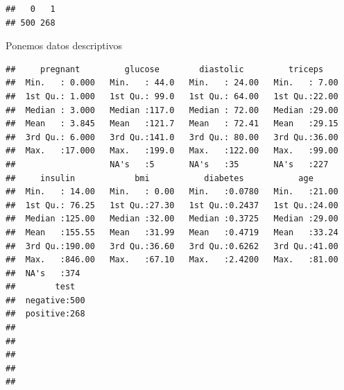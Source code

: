 \documentclass[
]{article}
\newenvironment{Shaded}{\begin{snugshade}}{\end{snugshade}}
\newcommand{\FunctionTok}[1]{\textcolor[rgb]{0.00,0.00,0.00}{#1}}
\newcommand{\NormalTok}[1]{#1}
\newcommand{\OtherTok}[1]{\textcolor[rgb]{0.56,0.35,0.01}{#1}}
\newcommand{\SpecialCharTok}[1]{\textcolor[rgb]{0.00,0.00,0.00}{#1}}
\newcommand{\StringTok}[1]{\textcolor[rgb]{0.31,0.60,0.02}{#1}}
\begin{document}
\begin{Shaded}
\end{Shaded}

\begin{verbatim}
##   0   1 
## 500 268
\end{verbatim}

Ponemos datos descriptivos

\begin{Shaded}
\end{Shaded}

\begin{verbatim}
##     pregnant         glucose        diastolic         triceps     
##  Min.   : 0.000   Min.   : 44.0   Min.   : 24.00   Min.   : 7.00  
##  1st Qu.: 1.000   1st Qu.: 99.0   1st Qu.: 64.00   1st Qu.:22.00  
##  Median : 3.000   Median :117.0   Median : 72.00   Median :29.00  
##  Mean   : 3.845   Mean   :121.7   Mean   : 72.41   Mean   :29.15  
##  3rd Qu.: 6.000   3rd Qu.:141.0   3rd Qu.: 80.00   3rd Qu.:36.00  
##  Max.   :17.000   Max.   :199.0   Max.   :122.00   Max.   :99.00  
##                   NA's   :5       NA's   :35       NA's   :227    
##     insulin            bmi           diabetes           age       
##  Min.   : 14.00   Min.   : 0.00   Min.   :0.0780   Min.   :21.00  
##  1st Qu.: 76.25   1st Qu.:27.30   1st Qu.:0.2437   1st Qu.:24.00  
##  Median :125.00   Median :32.00   Median :0.3725   Median :29.00  
##  Mean   :155.55   Mean   :31.99   Mean   :0.4719   Mean   :33.24  
##  3rd Qu.:190.00   3rd Qu.:36.60   3rd Qu.:0.6262   3rd Qu.:41.00  
##  Max.   :846.00   Max.   :67.10   Max.   :2.4200   Max.   :81.00  
##  NA's   :374                                                      
##        test    
##  negative:500  
##  positive:268  
##                
##                
##                
##                
## 
\end{verbatim}
\end{document}
